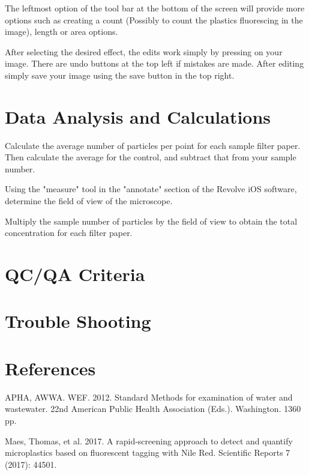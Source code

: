 \documentclass[12pt]{../SOP4_alpha}\usepackage[]{graphicx}\usepackage[]{color}
\begin{document}
\NP The leftmost option of the tool bar at the bottom of the screen will provide more options such as creating a count (Possibly to count the plastics fluorescing in the image), length or area options. 

\NP After selecting the desired effect, the edits work  simply by pressing on your image. There are undo buttons at the top left if mistakes are made. After editing simply save your image using the save button in the top right.

\section{Data Analysis and Calculations}

  \NP Calculate the average number of particles per point for each sample filter paper. Then calculate the average for the control, and subtract that from your sample number.

  \NP Using the "measure" tool in the "annotate" section of the Revolve iOS software, determine the field of view of the microscope.

  \NP Multiply the sample number of particles by the field of view to obtain the total concentration for each filter paper.
  


\section{QC/QA Criteria}

\section{Trouble Shooting}

\section{References}

\NP APHA, AWWA. WEF. 2012. Standard Methods for examination of water and wastewater. 22nd American Public Health Association (Eds.). Washington. 1360 pp.

\NP Maes, Thomas, et al. 2017. A rapid-screening approach to detect and quantify microplastics based on fluorescent tagging with Nile Red. Scientific Reports 7 (2017): 44501.
\end{document}
